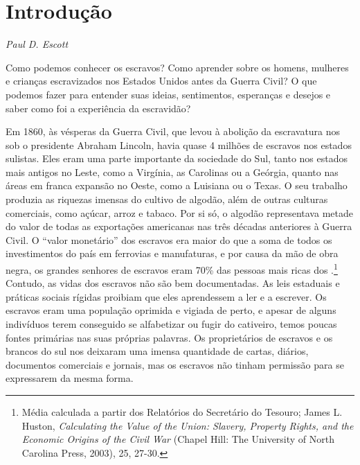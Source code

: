 \chapter*{Introdução}

\begin{flushright}
\emph{Paul D. Escott}
\end{flushright}

Como podemos conhecer os escravos? Como aprender sobre os homens,
mulheres e crianças escravizados nos Estados Unidos antes da Guerra
Civil? O que podemos fazer para entender suas ideias, sentimentos,
esperanças e desejos e saber como foi a experiência da escravidão?

Em 1860, às vésperas da Guerra Civil, que levou à abolição da
escravatura nos  sob o presidente Abraham Lincoln, havia quase 4
milhões de escravos nos estados sulistas. Eles eram uma parte importante
da sociedade do Sul, tanto nos estados mais antigos no Leste, como a
Virgínia, as Carolinas ou a Geórgia, quanto nas áreas em franca expansão
no Oeste, como a Luisiana ou o Texas. O seu trabalho produzia as
riquezas imensas do cultivo de algodão, além de outras culturas
comerciais, como açúcar, arroz e tabaco. Por si só, o algodão
representava metade do valor de todas as exportações americanas nas três
décadas anteriores à Guerra Civil. O ``valor monetário'' dos escravos
era maior do que a soma de todos os investimentos do país em ferrovias e
manufaturas, e por causa da mão de obra negra, os grandes senhores de
escravos eram 70\% das pessoas mais ricas dos .\footnote{Média
  calculada a partir dos Relatórios do Secretário do Tesouro; James L.
  Huston, \emph{Calculating the Value of the Union: Slavery, Property
  Rights, and the Economic Origins of the Civil War} (Chapel Hill: The
  University of North Carolina Press, 2003), 25, 27-30.} Contudo, as
vidas dos escravos não são bem documentadas. As leis estaduais e
práticas sociais rígidas proibiam que eles aprendessem a ler e a
escrever. Os escravos eram uma população oprimida e vigiada de perto, e
apesar de alguns indivíduos terem conseguido se alfabetizar ou fugir do
cativeiro, temos poucas fontes primárias nas suas próprias palavras. Os
proprietários de escravos e os brancos do sul nos deixaram uma imensa
quantidade de cartas, diários, documentos comerciais e jornais, mas os
escravos não tinham permissão para se expressarem da mesma forma.

